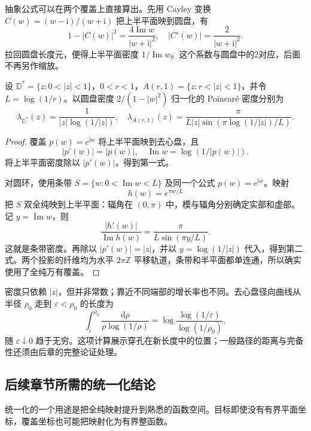 \ProseParagraphBreak
抽象公式可以在两个覆盖上直接算出。先用 Cayley 变换 \(C(w)=(w-\mathrm i)/(w+\mathrm i)\) 把上半平面映到圆盘，有
\[
 1-|C(w)|^2=\frac{4\operatorname{Im}w}{|w+\mathrm i|^2},
 \quad |C'(w)|=\frac2{|w+\mathrm i|^2}.
\]
拉回圆盘长度元，便得上半平面密度 \(1/\operatorname{Im}w\)。这个系数与圆盘中的2对应，后面不再另作缩放。

\begin{proposition}[去心盘与圆环的密度]\label{b3:prop:12-puncture-annulus-density}
设 \(\mathbb D^*=\{z:0<|z|<1\}\)，\(0<r<1\)，\(A(r,1)=\{z:r<|z|<1\}\)，并令 \(L=\log(1/r)\)。以圆盘密度 \(2/(1-|w|^2)\) 归一化的 Poincaré 密度分别为
\[
 \lambda_{\mathbb D^*}(z)=\frac1{|z|\log(1/|z|)},\quad
 \lambda_{A(r,1)}(z)=
 \frac{\pi}{L|z|\sin\!\left(\pi\log(1/|z|)/L\right)}.
\]
\end{proposition}
\begin{proof}
覆盖 \(p(w)=e^{\mathrm i w}\) 将上半平面映到去心盘，且
\[
 |p'(w)|=|p(w)|,\quad
 \operatorname{Im}w=\log(1/|p(w)|).
\]
将上半平面密度除以 \(|p'(w)|\)，得到第一式。

对圆环，使用条带 \(S=\{w:0<\operatorname{Im}w<L\}\) 及同一个公式 \(p(w)=e^{\mathrm i w}\)。映射
\[
 h(w)=e^{\pi w/L}
\]
把 \(S\) 双全纯映到上半平面：辐角在 \((0,\pi)\) 中，模与辐角分别确定实部和虚部。记 \(y=\operatorname{Im}w\)，则
\[
 \frac{|h'(w)|}{\operatorname{Im}h(w)}
 =\frac{\pi}{L\sin(\pi y/L)}.
\]
这就是条带密度。再除以 \(|p'(w)|=|z|\)，并以 \(y=\log(1/|z|)\) 代入，得到第二式。两个投影的纤维均为水平 \(2\pi\mathbb Z\) 平移轨道，条带和半平面都单连通，所以确实使用了全纯万有覆盖。
\end{proof}
密度只依赖 \(|z|\)，但并非常数；靠近不同端部的增长率也不同。去心盘径向曲线从半径 \(\rho_0\) 走到 \(\varepsilon<\rho_0\) 的长度为
\[
 \int_\varepsilon^{\rho_0}\frac{\mathrm d\rho}{\rho\log(1/\rho)}
 =\log\frac{\log(1/\varepsilon)}{\log(1/\rho_0)},
\]
随 \(\varepsilon\downarrow0\) 趋于无穷。这项计算展示穿孔在新长度中的位置；一般路径的距离与完备性还须由后章的完整论证处理。

\subsection{后续章节所需的统一化结论}
\label{b3:subsec:120404}

统一化的一个用途是把全纯映射提升到熟悉的函数空间。目标即使没有有界平面坐标，覆盖坐标也可能把映射化为有界整函数。

